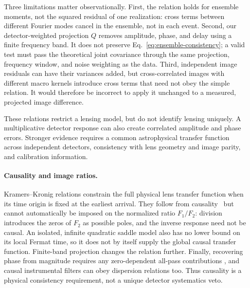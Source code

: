 Three limitations matter observationally.  First, the relation holds
for ensemble moments, not the squared residual of one realization:
cross terms between different Fourier modes cancel in the ensemble,
not in each event.  Second, our detector-weighted projection $Q$ removes
amplitude, phase, and delay using a finite frequency band.  It does not
preserve Eq.~\eqref{eq:ensemble-consistency}; a valid test must pass the
theoretical joint covariance through the same projection, frequency
window, and noise weighting as the data.  Third, independent image
residuals can have their variances added, but cross-correlated images
with different macro kernels introduce cross terms that need not obey
the simple relation.  It would therefore be incorrect to apply it
unchanged to a measured, projected image difference.

These relations restrict a lensing model, but do not identify lensing
uniquely.  A multiplicative detector response can also create correlated
amplitude and phase errors.  Stronger evidence requires a common
astrophysical transfer function across independent detectors, consistency
with lens geometry and image parity, and calibration information.

\paragraph{Causality and image ratios.}
Kramers--Kronig relations constrain the full physical lens transfer
function when its time origin is fixed at the earliest arrival.
They follow from causality~\cite{tanaka2023} but cannot automatically
be imposed on the normalized ratio $F_1/F_2$:
division introduces the zeros of $F_2$ as possible poles, and the inverse
response need not be causal.  An isolated, infinite quadratic saddle
model also has no lower bound on its local Fermat time, so it does not
by itself supply the global causal transfer function.  Finite-band
projection changes the relation further.  Finally, recovering phase
from magnitude requires any zero-dependent all-pass contributions
\cite{suyama2025}, and
causal instrumental filters can obey dispersion relations too.  Thus
causality is a physical consistency requirement, not a unique detector
systematics veto.
